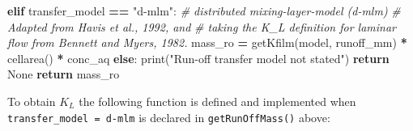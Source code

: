 \documentclass[]{article}
\newenvironment{Shaded}{\begin{snugshade}}{\end{snugshade}}
\newcommand{\StringTok}[1]{\textcolor[rgb]{0.31,0.60,0.02}{#1}}
\newcommand{\CommentTok}[1]{\textcolor[rgb]{0.56,0.35,0.01}{\textit{#1}}}
\newcommand{\VariableTok}[1]{\textcolor[rgb]{0.00,0.00,0.00}{#1}}
\newcommand{\ControlFlowTok}[1]{\textcolor[rgb]{0.13,0.29,0.53}{\textbf{#1}}}
\newcommand{\OperatorTok}[1]{\textcolor[rgb]{0.81,0.36,0.00}{\textbf{#1}}}
\newcommand{\BuiltInTok}[1]{#1}
\newcommand{\NormalTok}[1]{#1}
\begin{document}
\begin{Shaded}
\begin{Highlighting}[]
    \ControlFlowTok{elif}\NormalTok{ transfer_model }\OperatorTok{==} \StringTok{"d-mlm"}\NormalTok{:}
        \CommentTok{# distributed mixing-layer-model (d-mlm)}
        \CommentTok{# Adapted from Havis et al., 1992, and}
        \CommentTok{# taking the K_L definition for laminar flow from Bennett and Myers, 1982.}
\NormalTok{        mass_ro }\OperatorTok{=}\NormalTok{ getKfilm(model, runoff_mm) }\OperatorTok{*}\NormalTok{ cellarea() }\OperatorTok{*}\NormalTok{ conc_aq  }
    \ControlFlowTok{else}\NormalTok{:}
        \BuiltInTok{print}\NormalTok{(}\StringTok{"Run-off transfer model not stated"}\NormalTok{)}
        \ControlFlowTok{return} \VariableTok{None}
    \ControlFlowTok{return}\NormalTok{ mass_ro}
\end{Highlighting}
\end{Shaded}

To obtain \(K_L\) the following function is defined and implemented when
\texttt{transfer\_model\ =\ \textquotesingle{}d-mlm\textquotesingle{}}
is declared in \texttt{getRunOffMass()} above:
\end{document}
